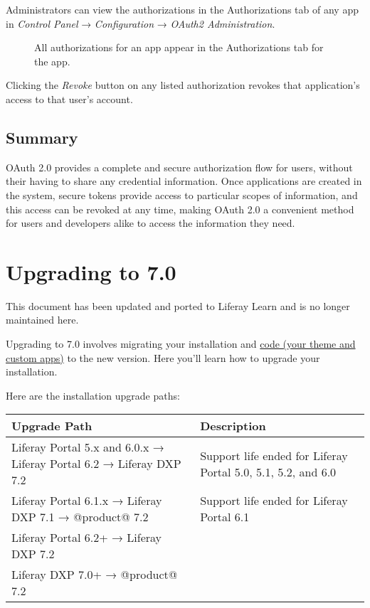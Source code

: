 Administrators can view the authorizations in the Authorizations tab of
any app in \emph{Control Panel} → \emph{Configuration} → \emph{OAuth2
Administration}.

\begin{figure}
\centering
{}
\caption{All authorizations for an app appear in the Authorizations tab
for the app.}
\end{figure}

Clicking the \emph{Revoke} button on any listed authorization revokes
that application's access to that user's account.

\section{Summary}\label{summary-3}

OAuth 2.0 provides a complete and secure authorization flow for users,
without their having to share any credential information. Once
applications are created in the system, secure tokens provide access to
particular scopes of information, and this access can be revoked at any
time, making OAuth 2.0 a convenient method for users and developers
alike to access the information they need.

\chapter{Upgrading to 7.0}\label{upgrading-to-7.0}

{This document has been updated and ported to Liferay Learn and is no
longer maintained here.}

Upgrading to 7.0 involves migrating your installation and
\href{/docs/7-2/tutorials/-/knowledge_base/t/upgrading-code-to-product-ver}{code
(your theme and custom apps)} to the new version. Here you'll learn how
to upgrade your installation.

Here are the installation upgrade paths:

\noindent\hrulefill

\begin{longtable}[]{@{}
  >{\raggedright\arraybackslash}p{}
  >{\raggedright\arraybackslash}p{}@{}}
\toprule\noalign{}
\begin{minipage}[b]{\linewidth}\raggedright
Upgrade Path
\end{minipage} & \begin{minipage}[b]{\linewidth}\raggedright
Description
\end{minipage} \\
\midrule\noalign{}
\endhead
\bottomrule\noalign{}
\endlastfoot
Liferay Portal 5.x and 6.0.x → Liferay Portal 6.2 → Liferay DXP 7.2 &
Support life ended for Liferay Portal 5.0, 5.1, 5.2, and 6.0 \\
Liferay Portal 6.1.x → Liferay DXP 7.1 → @product@ 7.2 & Support life
ended for Liferay Portal 6.1 \\
Liferay Portal 6.2+ → Liferay DXP 7.2 & \\
Liferay DXP 7.0+ → @product@ 7.2 & \\
\end{longtable}

